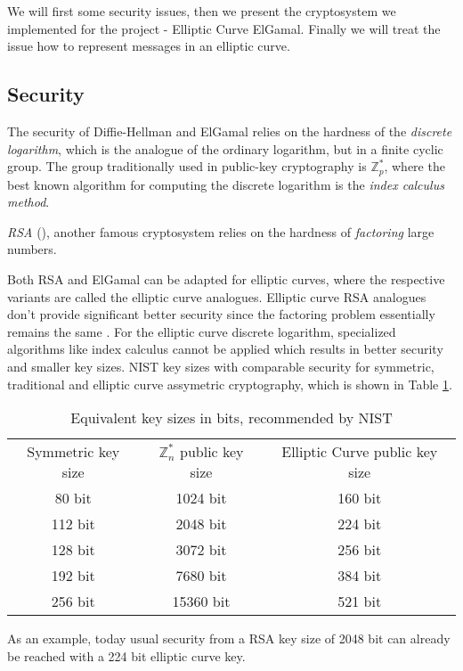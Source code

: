 \documentclass[11pt,english]{article}
\begin{document}
We will first some security issues, then we present the cryptosystem we implemented for the project - Elliptic Curve ElGamal. Finally we will treat the issue how to represent messages in an elliptic curve.

\subsection{Security}
The security of Diffie-Hellman and ElGamal relies on the hardness of the \emph{discrete logarithm}, which is the analogue of the ordinary logarithm, but in a finite cyclic group. The group traditionally used in public-key cryptography is $\mathbb{Z}_p^*$, where the best known algorithm for computing the discrete logarithm is the \emph{index calculus method}.

\emph{RSA} (\cite{Rivest78amethod}), another famous cryptosystem relies on the hardness of \emph{factoring} large numbers.

Both RSA and ElGamal can be adapted for elliptic curves, where the respective variants are called the elliptic curve analogues. Elliptic curve RSA analogues don't provide significant better security since the factoring problem essentially remains the same \cite{343485}. For the elliptic curve discrete logarithm, specialized algorithms like index calculus cannot be applied which results in better security and smaller key sizes. NIST key sizes with comparable security for symmetric, traditional and elliptic curve assymetric cryptography, which is shown in Table \ref{eqks}.

\begin{table}
\centering
\begin{tabular}{c|c|c}
Symmetric key size & $\mathbb{Z}_{n}^{*}$ public key size & Elliptic Curve public key size \\ \cline{1-3}
80 bit & 1024 bit & 160 bit \\ 
112 bit & 2048 bit & 224 bit \\ 
128 bit & 3072 bit & 256 bit \\ 
192 bit & 7680 bit & 384 bit \\ 
256 bit & 15360 bit & 521 bit
\end{tabular}
\caption{Equivalent key sizes in bits, recommended by NIST}
\label{eqks}
\end{table}

As an example, today usual security from a RSA key size of 2048 bit can already be reached with a 224 bit elliptic curve key.
\end{document}
